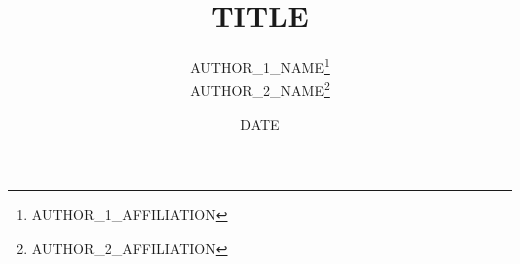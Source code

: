 
\title{{{TITLE}}}

\author{
  {{AUTHOR_1_NAME}}\thanks{{{AUTHOR_1_AFFILIATION}}} \\
  {{AUTHOR_2_NAME}}\thanks{{{AUTHOR_2_AFFILIATION}}}
}

\date{{{DATE}}}

\newcommand{\keywords}{{{KEYWORDS}}}

\newcommand{\highlights}{{{HIGHLIGHTS}}}
